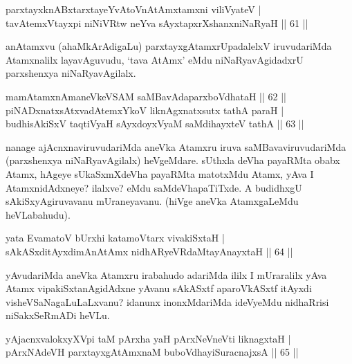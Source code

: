
\begin{shl}
parxtayxknABxtarxtayeYvAtoV\s nAtAmx\s \s tamxni viliVyateV |\\
tavA\s \s temxVtayxpi niNiVRtw neYva sAyxtapxrXshanxniNaRyaH \hfill || 61 ||
\end{shl}

\begin{artha}
anAtamxvu (ahaMkArAdigaLu) parxtayxgAtamxrUpadalelxV iruvudariMda Atamxnalilx layavAguvudu, `tava AtAmx' eMdu niNaRyavAgidadxrU parxshenxya niNaRyavAgilalx.
\end{artha}

\begin{shl}
mamA\s \s tamxnAmaneVkeVSAM saMBavAdaparxboVdhataH \hfill || 62 ||\\
piNADxnatxsAtxvadAtemxYkoV liknAgxnatxsutx tathA paraH |\\
budhisAkiSxV taqtiVyaH sAyxdoyxV\s yaM saMdihayxteV tathA \hfill || 63 ||
\end{shl}

\begin{artha}
nanage ajAcnxnaviruvudariMda aneVka Atamxru iruva saMBavaviruvudariMda (parxshenxya niNaRyavAgilalx) heVgeMdare. sUthxla deVha  payaRMta obabx Atamx, hAgeye sUkaSxmXdeVha payaRMta matotxMdu Atamx, yAva I AtamxnidAdxneye? ilalxve? eMdu saMdeVhapaTiTxde. A budidhxgU sAkiSxyAgiruvavanu mUraneyavanu. (hiVge aneVka AtamxgaLeMdu heVLabahudu).
\end{artha}

\begin{shl}
yata EvamatoV bUrxhi katamoV\s tarx vivakiSxtaH |\\
sAkASxditAyxdimAnAtAmx nidhARyeVRdaMtayA\s nayxtaH \hfill || 64 ||
\end{shl}

\begin{artha}%
yAvudariMda aneVka Atamxru irabahudo adariMda ililx I mUraralilx yAva Atamx vipakiSxtanAgidAdxne yAvanu sAkASxtf aparoVkASxtf itAyxdi visheVSaNagaLuLaLxvanu? idanunx inonxMdariMda ideVyeMdu nidhaRrisi niSakxSeRmADi heVLu.
\end{artha}

\begin{shl}
yAjacnxvalokxyXV\s pi taM pArxha yaH pArxNeVneVti liknagxtaH |\\
pArxNAdeVH parxtayxgAtAmxnaM buboVdhayiSuracnajxsA \hfill || 65 ||
\end{shl}

